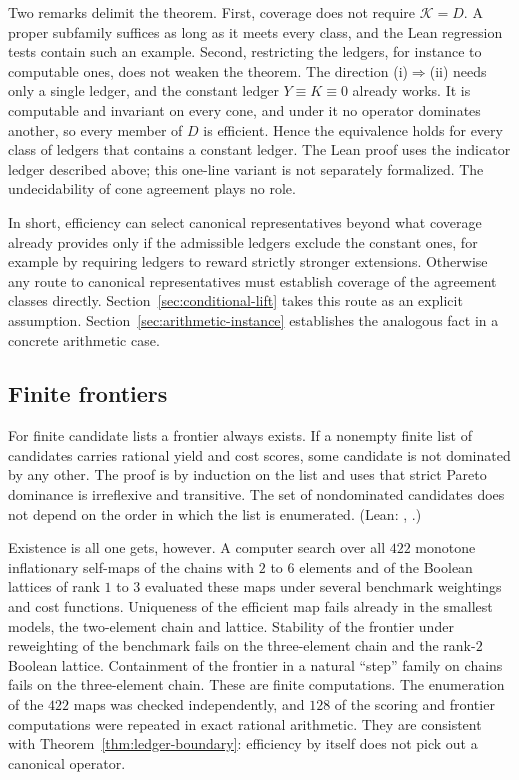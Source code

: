 Two remarks delimit the theorem. First, coverage does not require $\mathcal{K}=D$. A proper subfamily suffices as long as it meets every class, and the Lean regression tests contain such an example. Second, restricting the ledgers, for instance to computable ones, does not weaken the theorem. The direction (i)$\Rightarrow$(ii) needs only a single ledger, and the constant ledger $Y\equiv K\equiv 0$ already works. It is computable and invariant on every cone, and under it no operator dominates another, so every member of $D$ is efficient. Hence the equivalence holds for every class of ledgers that contains a constant ledger. The Lean proof uses the indicator ledger described above; this one-line variant is not separately formalized. The undecidability of cone agreement plays no role.

In short, efficiency can select canonical representatives beyond what coverage already provides only if the admissible ledgers exclude the constant ones, for example by requiring ledgers to reward strictly stronger extensions. Otherwise any route to canonical representatives must establish coverage of the agreement classes directly. Section~\ref{sec:conditional-lift} takes this route as an explicit assumption. Section~\ref{sec:arithmetic-instance} establishes the analogous fact in a concrete arithmetic case.

\subsection{Finite frontiers}

For finite candidate lists a frontier always exists. If a nonempty finite list of candidates carries rational yield and cost scores, some candidate is not dominated by any other. The proof is by induction on the list and uses that strict Pareto dominance is irreflexive and transitive. The set of nondominated candidates does not depend on the order in which the list is enumerated. (Lean: , .)

Existence is all one gets, however. A computer search over all $422$ monotone inflationary self-maps of the chains with $2$ to $6$ elements and of the Boolean lattices of rank $1$ to $3$ evaluated these maps under several benchmark weightings and cost functions. Uniqueness of the efficient map fails already in the smallest models, the two-element chain and lattice. Stability of the frontier under reweighting of the benchmark fails on the three-element chain and the rank-$2$ Boolean lattice. Containment of the frontier in a natural ``step'' family on chains fails on the three-element chain. These are finite computations. The enumeration of the $422$ maps was checked independently, and $128$ of the scoring and frontier computations were repeated in exact rational arithmetic. They are consistent with Theorem~\ref{thm:ledger-boundary}: efficiency by itself does not pick out a canonical operator.
